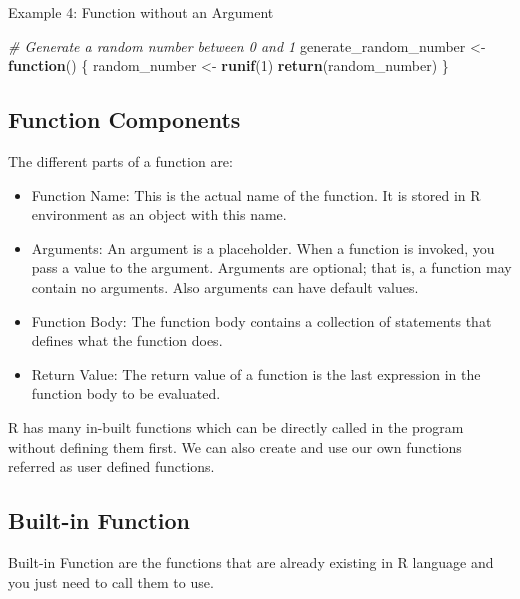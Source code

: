 \documentclass[
]{book}
\newenvironment{Shaded}{\begin{snugshade}}{\end{snugshade}}
\newcommand{\CommentTok}[1]{\textcolor[rgb]{0.56,0.35,0.01}{\textit{#1}}}
\newcommand{\ControlFlowTok}[1]{\textcolor[rgb]{0.13,0.29,0.53}{\textbf{#1}}}
\newcommand{\DecValTok}[1]{\textcolor[rgb]{0.00,0.00,0.81}{#1}}
\newcommand{\FunctionTok}[1]{\textcolor[rgb]{0.13,0.29,0.53}{\textbf{#1}}}
\newcommand{\NormalTok}[1]{#1}
\newcommand{\OtherTok}[1]{\textcolor[rgb]{0.56,0.35,0.01}{#1}}
\begin{document}
Example 4: Function without an Argument

\begin{Shaded}
\begin{Highlighting}[]
\CommentTok{\# Generate a random number between 0 and 1}
\NormalTok{generate\_random\_number }\OtherTok{\textless{}{-}} \ControlFlowTok{function}\NormalTok{() \{}
\NormalTok{  random\_number }\OtherTok{\textless{}{-}} \FunctionTok{runif}\NormalTok{(}\DecValTok{1}\NormalTok{)}
  \FunctionTok{return}\NormalTok{(random\_number)}
\NormalTok{\}}
\end{Highlighting}
\end{Shaded}

\hypertarget{function-components}{%
\subsection*{Function Components}\label{function-components}}

The different parts of a function are:

\begin{itemize}
\item
  Function Name: This is the actual name of the function. It is stored in R environment as an object with this name.
\item
  Arguments: An argument is a placeholder. When a function is invoked, you pass a value to the argument. Arguments are optional; that is, a function may contain no arguments. Also arguments can have default values.
\item
  Function Body: The function body contains a collection of statements that defines what the function does.
\item
  Return Value: The return value of a function is the last expression in the function body to be evaluated.
\end{itemize}

R has many in-built functions which can be directly called in the program without defining them first. We can also create and use our own functions referred as user defined functions.

\hypertarget{built-in-function}{%
\subsection*{Built-in Function}\label{built-in-function}}

Built-in Function are the functions that are already existing in R language and you just need to call them to use.
\end{document}
